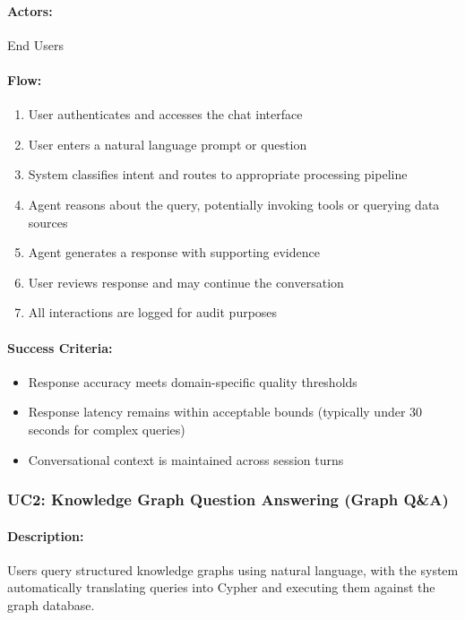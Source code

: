 \documentclass[a4paper,twoside]{sapthesis}
\begin{document}
\paragraph{Actors:} End Users

\paragraph{Flow:}
\begin{enumerate}
    \item User authenticates and accesses the chat interface
    \item User enters a natural language prompt or question
    \item System classifies intent and routes to appropriate processing pipeline
    \item Agent reasons about the query, potentially invoking tools or querying data sources
    \item Agent generates a response with supporting evidence
    \item User reviews response and may continue the conversation
    \item All interactions are logged for audit purposes
\end{enumerate}

\paragraph{Success Criteria:}
\begin{itemize}
    \item Response accuracy meets domain-specific quality thresholds
    \item Response latency remains within acceptable bounds (typically under 30 seconds for complex queries)
    \item Conversational context is maintained across session turns
\end{itemize}

\subsubsection{UC2: Knowledge Graph Question Answering (Graph Q\&A)}

\paragraph{Description:} Users query structured knowledge graphs using natural language, with the system automatically translating queries into Cypher and executing them against the graph database.
\end{document}
